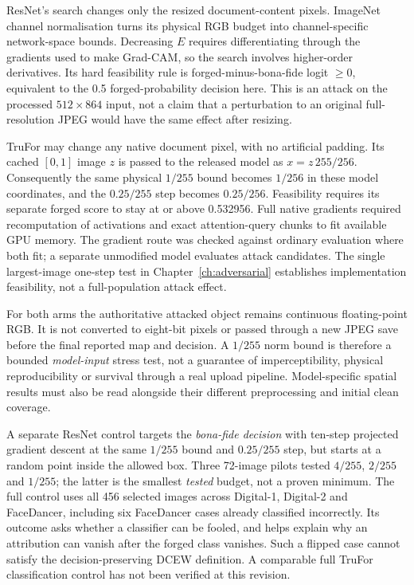 ResNet's search changes only the resized document-content pixels. ImageNet channel normalisation turns its physical RGB budget into channel-specific network-space bounds. Decreasing $E$ requires differentiating through the gradients used to make Grad-CAM, so the search involves higher-order derivatives. Its hard feasibility rule is forged-minus-bona-fide logit $\geq0$, equivalent to the 0.5 forged-probability decision here. This is an attack on the processed $512\times864$ input, not a claim that a perturbation to an original full-resolution JPEG would have the same effect after resizing.

TruFor may change any native document pixel, with no artificial padding. Its cached $[0,1]$ image $z$ is passed to the released model as $x=z\,255/256$. Consequently the same physical $1/255$ bound becomes $1/256$ in these model coordinates, and the $0.25/255$ step becomes $0.25/256$. Feasibility requires its separate forged score to stay at or above 0.532956. Full native gradients required recomputation of activations and exact attention-query chunks to fit available GPU memory. The gradient route was checked against ordinary evaluation where both fit; a separate unmodified model evaluates attack candidates. The single largest-image one-step test in Chapter~\ref{ch:adversarial} establishes implementation feasibility, not a full-population attack effect.

For both arms the authoritative attacked object remains continuous floating-point RGB. It is not converted to eight-bit pixels or passed through a new JPEG save before the final reported map and decision. A $1/255$ norm bound is therefore a bounded \emph{model-input} stress test, not a guarantee of imperceptibility, physical reproducibility or survival through a real upload pipeline. Model-specific spatial results must also be read alongside their different preprocessing and initial clean coverage.

A separate ResNet control targets the \emph{bona-fide decision} with ten-step projected gradient descent at the same $1/255$ bound and $0.25/255$ step, but starts at a random point inside the allowed box. Three 72-image pilots tested $4/255$, $2/255$ and $1/255$; the latter is the smallest \emph{tested} budget, not a proven minimum. The full control uses all 456 selected images across Digital-1, Digital-2 and FaceDancer, including six FaceDancer cases already classified incorrectly. Its outcome asks whether a classifier can be fooled, and helps explain why an attribution can vanish after the forged class vanishes. Such a flipped case cannot satisfy the decision-preserving DCEW definition. A comparable full TruFor classification control has not been verified at this revision.

